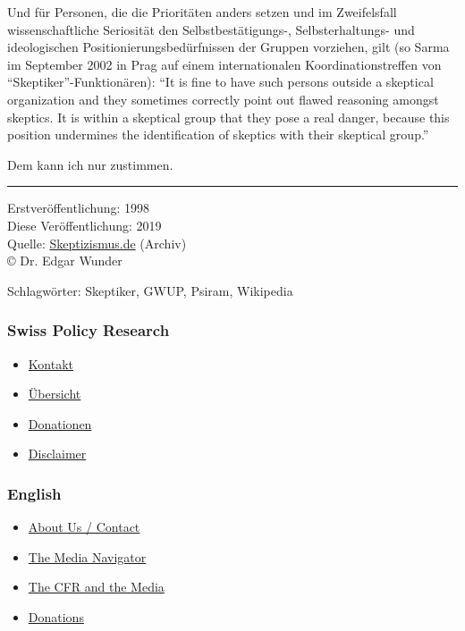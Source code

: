 Und für Personen, die die Prioritäten anders setzen und im Zweifelsfall
wissenschaftliche Seriosität den Selbstbestätigungs-, Selbsterhaltungs-
und ideologischen Positionierungsbedürfnissen der Gruppen vorziehen,
gilt (so Sarma im September 2002 in Prag auf einem internationalen
Koordinationstreffen von ``Skeptiker''-Funktionären): ``It is fine to
have such persons outside a skeptical organization and they sometimes
correctly point out flawed reasoning amongst skeptics. It is within a
skeptical group that they pose a real danger, because this position
undermines the identification of skeptics with their skeptical group.''

Dem kann ich nur zustimmen.

\begin{center}\rule{0.5\linewidth}{\linethickness}\end{center}

Erstveröffentlichung: 1998\\
Diese Veröffentlichung: 2019\\
Quelle:
\href{https://web.archive.org/web/20170905223349/http://www.skeptizismus.de/index.html}{Skeptizismus.de}
(Archiv)\\
© Dr. Edgar Wunder

Schlagwörter: Skeptiker, GWUP, Psiram, Wikipedia

\hypertarget{swiss-policy-research}{%
\subsubsection{Swiss Policy Research}\label{swiss-policy-research}}

\begin{itemize}
\tightlist
\item
  \href{https://swprs.org/kontakt/}{Kontakt}
\item
  \href{https://swprs.org/uebersicht/}{Übersicht}
\item
  \href{https://swprs.org/donationen/}{Donationen}
\item
  \href{https://swprs.org/disclaimer/}{Disclaimer}
\end{itemize}

\hypertarget{english}{%
\subsubsection{English}\label{english}}

\begin{itemize}
\tightlist
\item
  \href{https://swprs.org/contact/}{About Us / Contact}
\item
  \href{https://swprs.org/media-navigator/}{The Media Navigator}
\item
  \href{https://swprs.org/the-american-empire-and-its-media/}{The CFR
  and the Media}
\item
  \href{https://swprs.org/donations/}{Donations}
\end{itemize}

